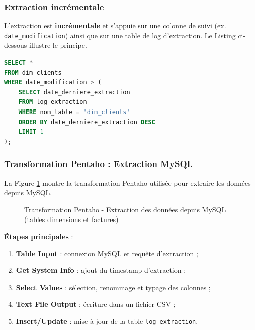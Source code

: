 \documentclass[12pt,a4paper]{report}
\begin{document}
\subsubsection{Extraction incrémentale}

L'extraction est \textbf{incrémentale} et s'appuie sur une colonne de suivi (ex. \texttt{date\_modification}) ainsi que sur une table de log d'extraction. Le Listing ci-dessous illustre le principe.

\begin{lstlisting}[language=SQL, caption=Exemple d'extraction incrémentale MySQL]
SELECT *
FROM dim_clients
WHERE date_modification > (
    SELECT date_derniere_extraction
    FROM log_extraction
    WHERE nom_table = 'dim_clients'
    ORDER BY date_derniere_extraction DESC
    LIMIT 1
);
\end{lstlisting}

\subsubsection{Transformation Pentaho : Extraction MySQL}

La Figure \ref{fig:extraction_mysql} montre la transformation Pentaho utilisée pour extraire les données depuis MySQL.

\begin{figure}[H]
    \centering
    \caption{Transformation Pentaho - Extraction des données depuis MySQL (tables dimensions et factures)}
    \label{fig:extraction_mysql}
\end{figure}

\textbf{Étapes principales} :
\begin{enumerate}
    \item \textbf{Table Input} : connexion MySQL et requête d'extraction ;
    \item \textbf{Get System Info} : ajout du timestamp d'extraction ;
    \item \textbf{Select Values} : sélection, renommage et typage des colonnes ;
    \item \textbf{Text File Output} : écriture dans un fichier CSV ;
    \item \textbf{Insert/Update} : mise à jour de la table \texttt{log\_extraction}.
\end{enumerate}
\end{document}

